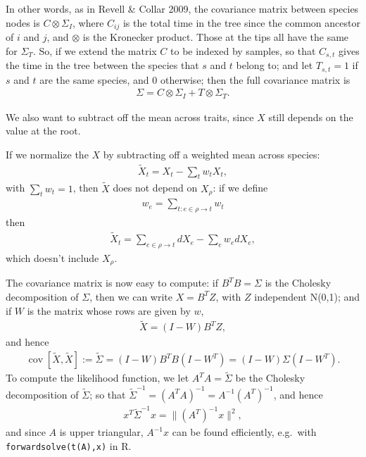 \documentclass{article}
\DeclareMathOperator{\cov}{cov}
\begin{document}
In other words, as in Revell \& Collar 2009, the covariance matrix between species nodes is $C \otimes \Sigma_I$,
where $C_{ij}$ is the total time in the tree since the common ancestor of $i$ and $j$,
and $\otimes$ is the Kronecker product.
Those at the tips all have the same for $\Sigma_T$.
So, if we extend the matrix $C$ to be indexed by samples, 
so that $C_{s,t}$ gives the time in the tree between the species that $s$ and $t$ belong to;
and let $T_{s,t} = 1$ if $s$ and $t$ are the same species, and 0 otherwise;
then the full covariance matrix is
\begin{align}
    \Sigma = C \otimes \Sigma_I + T \otimes \Sigma_T .
\end{align}

We also want to subtract off the mean across traits,
since $X$ still depends on the value at the root.

If we normalize the $X$ by subtracting off a weighted mean across species: 
\begin{align}
\tilde X_t = X_t - \sum_t w_t X_t,
\end{align}
with $\sum_t w_t = 1$,
then $\tilde X$ does not depend on $X_\rho$:
if we define 
\begin{align}
    w_e = \sum_{t : e \in \rho \to t} w_t
\end{align}
then
\begin{align}
    \tilde X_t = \sum_{e \in \rho \to t} dX_e - \sum_e w_e dX_e,
\end{align}
which doesn't include $X_\rho$.

The covariance matrix is now easy to compute:
if $B^T B = \Sigma$ is the Cholesky decomposition of $\Sigma$, then we can write $X = B^T Z$,
with $Z$ independent N(0,1);
and if $W$ is the matrix whose rows are given by $w$,
\begin{align}
  \tilde X = (I-W) B^T Z,
\end{align}
and hence
\begin{align}
  \cov[\tilde X, \tilde X] := \tilde \Sigma = (I-W)B^T B (I-W^T) = (I-W) \Sigma (I-W^T) .
\end{align}
To compute the likelihood function, we let $A^T A = \tilde \Sigma$ be the Cholesky decomposition of $\tilde \Sigma$;
so that $\tilde \Sigma^{-1} = (A^T A)^{-1} = A^{-1} (A^T)^{-1}$, and hence
\begin{align}
  x^T \tilde \Sigma^{-1} x = \| (A^T)^{-1} x \|^2 ,
\end{align}
and since $A$ is upper triangular, $A^{-1} x$ can be found efficiently, e.g.\ with \texttt{forwardsolve(t(A),x)} in R.
\end{document}

